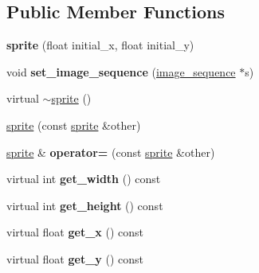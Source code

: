 \subsection*{Public Member Functions}
\begin{DoxyCompactItemize}
\item 
\mbox{\label{classcsis3700_1_1sprite_a5395ad1b481e56895f11d57c7a052353}} 
{\bfseries sprite} (float initial\+\_\+x, float initial\+\_\+y)
\item 
\mbox{\label{classcsis3700_1_1sprite_a0b6e3ec9733f1300aac47ecf8570ee0b}} 
void {\bfseries set\+\_\+image\+\_\+sequence} (\hyperlink{classcsis3700_1_1image__sequence}{image\+\_\+sequence} $\ast$s)
\item 
virtual \hyperlink{classcsis3700_1_1sprite_a8f6db48ecf33279af2d084a344baae8c}{$\sim$sprite} ()
\item 
\hyperlink{classcsis3700_1_1sprite_adff79f206ea0703727a72287242fd8b1}{sprite} (const \hyperlink{classcsis3700_1_1sprite}{sprite} \&other)
\item 
\mbox{\label{classcsis3700_1_1sprite_abd31e459d917f4789dd203730144e19a}} 
\hyperlink{classcsis3700_1_1sprite}{sprite} \& {\bfseries operator=} (const \hyperlink{classcsis3700_1_1sprite}{sprite} \&other)
\item 
\mbox{\label{classcsis3700_1_1sprite_a8370bcf8a127a7cb240a085400cac95d}} 
virtual int {\bfseries get\+\_\+width} () const
\item 
\mbox{\label{classcsis3700_1_1sprite_a9883c2534640adab14fe8594ba4b4f33}} 
virtual int {\bfseries get\+\_\+height} () const
\item 
\mbox{\label{classcsis3700_1_1sprite_af70f95b93fe418307c3ec9b95c97e899}} 
virtual float {\bfseries get\+\_\+x} () const
\item 
\mbox{\label{classcsis3700_1_1sprite_a2b9c0912475c1d42cf4204591d2ecf1b}} 
virtual float {\bfseries get\+\_\+y} () const
\item 
\mbox{\label{classcsis3700_1_1sprite_a2678deb93962cd15eeac659532066d78}} 

\end{DoxyCompactItemize}
